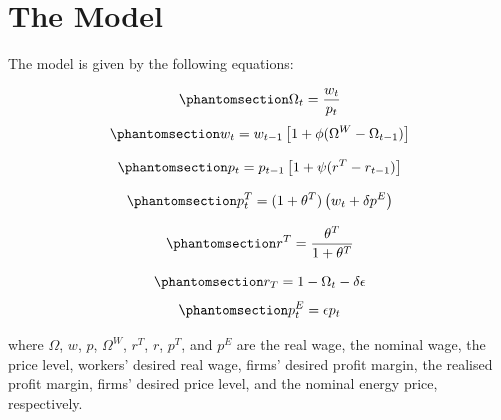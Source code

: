 \documentclass[
  letterpaper,
  DIV=11,
  numbers=noendperiod]{scrreprt}
\begin{document}
\section{The Model}\label{the-model-7}

The model is given by the following equations:

\begin{equation}\phantomsection\label{eq-conflict_omega}{
\Omega_t = \frac{w_t}{p_t} 
}\end{equation} \begin{equation}\phantomsection\label{eq-conflict_w}{
w_{t}  = w_{t-1}\left[ 1 + \phi(\Omega^W - \Omega_{t-1}) \right]
}\end{equation}

\begin{equation}\phantomsection\label{eq-conflict_p}{
p_t= p_{t-1} \left[ 1 + \psi (r^T - r_{t-1}) \right] 
}\end{equation}

\begin{equation}\phantomsection\label{eq-conflict_pf}{
p^T_t=(1+\theta^T)\left(w_t + \delta p^E\right)  
}\end{equation}

\begin{equation}\phantomsection\label{eq-conflict_rf}{
r^T=\frac{\theta^T}{1+\theta^T}
}\end{equation}

\begin{equation}\phantomsection\label{eq-conflict_r}{
r_T=1-\Omega_t - \delta \epsilon
}\end{equation} \begin{equation}\phantomsection\label{eq-conflict_p_E}{
p^E_t = \epsilon p_t 
}\end{equation}

where \(\Omega\), \(w\), \(p\), \(\Omega^W\), \(r^T\), \(r\), \(p^T\),
and \(p^E\) are the real wage, the nominal wage, the price level,
workers' desired real wage, firms' desired profit margin, the realised
profit margin, firms' desired price level, and the nominal energy price,
respectively.
\end{document}
